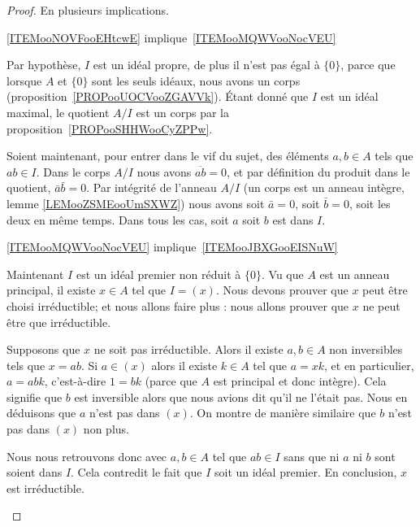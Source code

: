 \begin{proof}
    En plusieurs implications.
    \begin{subproof}
        \item[\ref{ITEMooNOVFooEHtcwE} implique~\ref{ITEMooMQWVooNocVEU}]

            Par hypothèse, \( I\) est un idéal propre, de plus il n'est pas égal à \( \{ 0 \}\), parce que lorsque \( A\) et \( \{ 0 \} \) sont les seuls idéaux, nous avons un corps (proposition~\ref{PROPooUOCVooZGAVVk}). Étant donné que \( I\) est un idéal maximal, le quotient \( A/I\) est un corps par la proposition~\ref{PROPooSHHWooCyZPPw}.

            Soient maintenant, pour entrer dans le vif du sujet, des éléments \( a,b\in A\) tels que \( ab\in I\). Dans le corps \( A/I\) nous avons \( \overline{ ab }=0\), et par définition du produit dans le quotient, \( \bar a\bar b=0\). Par intégrité de l'anneau \( A/I\) (un corps est un anneau intègre, lemme \ref{LEMooZSMEooUmSXWZ}) nous avons soit \( \bar a=0\), soit \( \bar b=0\), soit les deux en même temps. Dans tous les cas, soit \( a\) soit \( b\) est dans \( I\).

        \item[\ref{ITEMooMQWVooNocVEU} implique~\ref{ITEMooJBXGooEISNuW}]

            Maintenant \( I\) est un idéal premier non réduit à \( \{ 0 \}\). Vu que \( A\) est un anneau principal, il existe \( x\in A\) tel que \( I=(x)\). Nous devons prouver que \( x\) peut être choisi irréductible; et nous allons faire plus : nous allons prouver que \( x\) ne peut être que irréductible.

            Supposons que \( x\) ne soit pas irréductible. Alors il existe \( a,b\in A\) non inversibles tels que \( x=ab\). Si \( a\in (x)\) alors il existe \( k\in A\) tel que \( a=xk\), et en particulier, \( a=abk\), c'est-à-dire \( 1=bk\) (parce que \( A\) est principal et donc intègre). Cela signifie que \( b\) est inversible alors que nous avions dit qu'il ne l'était pas. Nous en déduisons que \( a\) n'est pas dans \( (x)\). On montre de manière similaire que \( b\) n'est pas dans \( (x)\) non plus.

            Nous nous retrouvons donc avec \( a,b\in A\) tel que \( ab\in I\) sans que ni \( a\) ni \( b\) sont soient dans \( I\). Cela contredit le fait que \( I\) soit un idéal premier. En conclusion, \( x\) est irréductible.


\end{subproof}
\end{proof}

